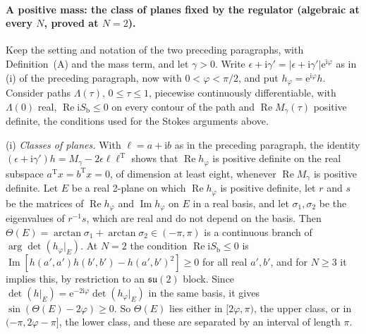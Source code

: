 \paragraph{A positive mass: the class of planes fixed by the regulator (algebraic at every \(N\), proved at \(N=2\)).}
Keep the setting and notation of the two preceding paragraphs, with Definition~(A) and the mass term, and let \(\gamma>0\). Write \(\epsilon+\mathrm i\gamma'=|\epsilon+\mathrm i\gamma'|\mathrm e^{\mathrm i\varphi}\) as in (i) of the preceding paragraph, now with \(0<\varphi<\pi/2\), and put \(h_\varphi=\mathrm e^{\mathrm i\varphi}h\). Consider paths \(\Lambda(\tau)\), \(0\le\tau\le1\), piecewise continuously differentiable, with \(\Lambda(0)\) real, \(\operatorname{Re}\mathrm iS_{\mathrm b}\le0\) on every contour of the path and \(\operatorname{Re}M_\gamma(\tau)\) positive definite, the conditions used for the Stokes arguments above.

(i) \emph{Classes of planes.} With \(\ell=a+\mathrm ib\) as in the preceding paragraph, the identity \((\epsilon+\mathrm i\gamma')h=M_\gamma-2\epsilon\ell\ell^{\mathrm T}\) shows that \(\operatorname{Re}h_\varphi\) is positive definite on the real subspace \(a^{\mathrm T}x=b^{\mathrm T}x=0\), of dimension at least eight, whenever \(\operatorname{Re}M_\gamma\) is positive definite. Let \(E\) be a real 2-plane on which \(\operatorname{Re}h_\varphi\) is positive definite, let \(r\) and \(s\) be the matrices of \(\operatorname{Re}h_\varphi\) and \(\operatorname{Im}h_\varphi\) on \(E\) in a real basis, and let \(\sigma_1,\sigma_2\) be the eigenvalues of \(r^{-1}s\), which are real and do not depend on the basis. Then \(\Theta(E)=\arctan\sigma_1+\arctan\sigma_2\in(-\pi,\pi)\) is a continuous branch of \(\arg\det(h_\varphi|_E)\). At \(N=2\) the condition \(\operatorname{Re}\mathrm iS_{\mathrm b}\le0\) is \(\operatorname{Im}[h(a',a')h(b',b')-h(a',b')^2]\ge0\) for all real \(a',b'\), and for \(N\ge3\) it implies this, by restriction to an \(\mathfrak{su}(2)\) block. Since \(\det(h|_E)=\mathrm e^{-2\mathrm i\varphi}\det(h_\varphi|_E)\) in the same basis, it gives \(\sin(\Theta(E)-2\varphi)\ge0\). So \(\Theta(E)\) lies either in \([2\varphi,\pi)\), the upper class, or in \((-\pi,2\varphi-\pi]\), the lower class, and these are separated by an interval of length \(\pi\).

